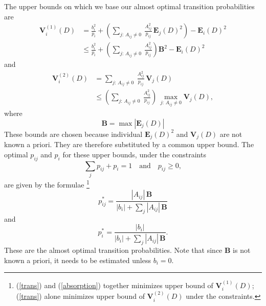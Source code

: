 \documentclass{elsart}
\theoremstyle{remark}
\theoremstyle{definition}
\theoremstyle{proof}
\begin{document}
        The upper bounds on which we base our almost optimal transition
        probabilities are
        \[ \begin{split}
            \mathbf{V}_i^{(1)}(D)
            &= \frac{b_i^2}{p_i} + \left(\sum_{j:\,A_{ij}\ne0}\:
               \frac{A_{ij}^2}{p_{ij}}\, \mathbf{E}_j(D)^2\right)
               - \mathbf{E}_i(D)^2 \\
            &\le \frac{b_i^2}{p_i} + \left(\sum_{j:\,A_{ij}\ne0}\:
                             \frac{A_{ij}^2}{p_{ij}} \right) \mathbf{B}^2
                 - \mathbf{E}_i(D)^2
        \end{split} \]
        and
        \[ \begin{split}
            \mathbf{V}_i^{(2)}(D)
            &= \sum_{j:\,A_{ij}\ne0}\:
               \frac{A_{ij}^2}{p_{ij}}\, \mathbf{V}_j(D) \\
            &\le \left(\sum_{j:\,A_{ij}\ne0}\: \frac{A_{ij}^2}{p_{ij}}\right)\, 
               \max_{j:\,A_{ij}\ne0} \mathbf{V}_j(D),
        \end{split} \]
        where 
        \[ \mathbf{B} = \max |\mathbf{E}_j(D)|
        \]
        These bounds are chosen because individual $\mathbf{E}_j(D)^2$ and
        $\mathbf{V}_j(D)$ are not known a priori.  They are therefore
        substituted by a common upper bound.  The optimal $p_{ij}$ and $p_i$
        for these upper bounds, under the constraints
        \[ \sum_j p_{ij} + p_i = 1\quad\mbox{and}\quad p_{ij}\ge 0, \]
        are given by the formulae
        \footnote{(\ref{trans}) and (\ref{absorption}) together minimizes
        upper bound of $\mathbf{V}_i^{(1)}(D)$; (\ref{trans}) alone minimizes
        upper bound of $\mathbf{V}_i^{(2)}(D)$ under the constraints.}
        \begin{equation} \label{trans}
            p_{ij}^* = \frac{|A_{ij}|\, \mathbf{B}}
                            {|b_i| + \sum_j |A_{ij}|\, \mathbf{B}}
        \end{equation}
        and
        \begin{equation} \label{absorption}
            p_i^* = \frac{|b_i|} {|b_i| + \sum_j |A_{ij}|\, \mathbf{B}}.
        \end{equation}
        These are the almost optimal transition probabilities.  Note that
        since $\mathbf{B}$ is not known a priori, it needs to be estimated
        unless $b_i = 0$.
        
\end{document}
